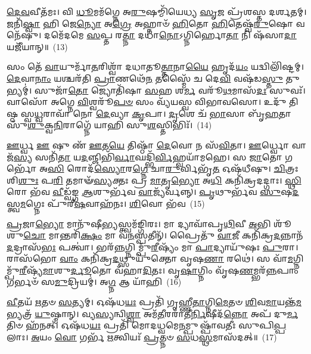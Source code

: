 \-\ul{𑌦𑍇}\-\-\ul{𑌵}\-𑌵𑍀𑌤᳴𑌮𑌃। 𑌵𑌿 \ul{𑌧𑍂}\-𑌮𑌮᳴𑌗𑍍𑌨𑍇 𑌅\-\ul{𑌰𑍁}\-𑌷𑌮𑍍𑌮𑌿᳴𑌯𑍇𑌧𑍍𑌯 \ul{𑌸𑍃}\-𑌜 𑌪𑍍𑌰᳴𑌶𑌸𑍍𑌤 𑌦𑌰𑍍\mbox{}\-\ul{𑌶}\-𑌤𑌮𑍍। 𑌜𑌨𑌿᳴\-\ul{𑌷𑍍𑌵𑌾} 𑌹𑌿 𑌜𑍇\-\ul{𑌨𑍍𑌯𑍋} 𑌅\-\ul{𑌗𑍍𑌰𑍇} 𑌅𑌹𑍍𑌨𑌾𑍞᳴ \ul{𑌹𑌿}\-𑌤𑍋 \ul{𑌹𑌿}\-𑌤𑍇𑌷𑍍𑌵᳴\-\ul{𑌰𑍁}\-𑌷𑍋 𑌵𑌨𑍇᳴𑌷𑍁। 𑌦𑌮𑍇᳴𑌦𑌮𑍇 \ul{𑌸}\-𑌪𑍍𑌤 𑌰\-\ul{𑌤𑍍𑌨𑌾} 𑌦𑌧𑌾᳴\-\ul{𑌨𑍋}\-\-𑌽𑌗𑍍𑌨𑌿𑌰𑍍\mbox{}𑌹𑍋\-\ul{𑌤𑌾} 𑌨𑌿 𑌷᳴𑌸𑌾\-\ul{𑌦𑌾} 𑌯𑌜𑍀᳴𑌯𑌾𑌨𑍍॥~(13)

{\anuvakamend[{\-\ul{𑌸𑍍𑌥} \ul{𑌈}\-\-\ul{𑌧𑍇} 𑌶𑍋𑌚᳴𑌸𑍍𑌵 \ul{𑌸}\-𑌪𑍍𑌤𑌵𑌿𑍞᳴𑌶𑌤𑌿𑌶𑍍𑌚}]}%

𑌸𑌂 𑌤𑍇᳴ \ul{𑌵𑌾}\-𑌯𑍁𑌰𑍍𑌮𑌾᳴\-\ul{𑌤}\-𑌰𑌿𑌶𑍍𑌵𑌾᳴ 𑌦𑌧𑌾𑌤𑍂\-\ul{𑌤𑍍𑌤𑌾}\-𑌨𑌾\-\ul{𑌯𑍈} 𑌹𑍃𑌦᳴\-\ul{𑌯𑌂} 𑌯𑌦𑍍𑌵𑌿𑌲𑌿᳴𑌷𑍍𑌟𑌮𑍍। \ul{𑌦𑍇}\-𑌵𑌾\-\ul{𑌨𑌾𑌂} 𑌯𑌶𑍍𑌚𑌰᳴𑌤𑌿 \ul{𑌪𑍍𑌰𑌾}\-𑌣𑌥𑍇᳴\-\ul{𑌨} 𑌤𑌸𑍍𑌮𑍈᳴ 𑌚 𑌦𑍇\-\ul{𑌵𑌿} 𑌵𑌷᳴𑌡\-\ul{𑌸𑍍𑌤𑍁} 𑌤𑍁𑌭𑍍𑌯𑌮𑍍॑। 𑌸𑍁𑌜𑌾᳴\-\ul{𑌤𑍋} 𑌜𑍍𑌯𑍋𑌤𑌿᳴𑌷𑌾 \ul{𑌸}\-𑌹 𑌶\-\ul{𑌰𑍍𑌮} 𑌵𑌰𑍂᳴\-\ul{𑌥}\-𑌮𑌾𑌸᳴\-\ul{𑌦𑌃} 𑌸𑍁𑌵𑌃᳴। 𑌵𑌾𑌸𑍋᳴ 𑌅𑌗𑍍𑌨𑍇 \ul{𑌵𑌿}\-𑌶𑍍𑌵𑌰𑍂᳴\-\ul{𑌪}\-\-\ul{𑍞} 𑌸𑌂 𑌵𑍍𑌯᳴𑌯𑌸𑍍𑌵 𑌵𑌿𑌭𑌾𑌵𑌸𑍋। 𑌉𑌦𑍁᳴ 𑌤𑌿𑌷𑍍𑌠 𑌸𑍍𑌵\-\ul{𑌧𑍍𑌵}\-𑌰𑌾𑌵𑌾᳴ 𑌨𑍋 \ul{𑌦𑍇}\-𑌵𑍍𑌯𑌾 \ul{𑌕𑍃}\-𑌪𑌾। \ul{𑌦𑍃}\-𑌶𑍇 𑌚᳴ \ul{𑌭𑌾}\-𑌸𑌾 𑌬𑍃᳴\-\ul{𑌹}\-𑌤𑌾 𑌸𑍁᳴\-\ul{𑌶𑍁}\-𑌕𑍍𑌵\-\ul{𑌨𑌿}\-𑌰𑌾𑌗𑍍𑌨𑍇᳴ 𑌯𑌾𑌹𑌿 𑌸𑍁\-\ul{𑌶}\-𑌸𑍍𑌤𑌿𑌭𑌿𑌃᳴।~(14)

\-\ul{𑌊}\-𑌰𑍍𑌧𑍍𑌵 \ul{𑌊} 𑌷𑍁 𑌣᳴ \ul{𑌊}\-𑌤\-\ul{𑌯𑍇} 𑌤𑌿𑌷𑍍𑌠𑌾᳴ \ul{𑌦𑍇}\-𑌵𑍋 𑌨 𑌸᳴\-\ul{𑌵𑌿}\-𑌤𑌾। \ul{𑌊}\-𑌰𑍍𑌧𑍍𑌵𑍋 𑌵𑌾𑌜᳴\-\ul{𑌸𑍍𑌯} 𑌸𑌨𑌿᳴\-\ul{𑌤𑌾} 𑌯\-\ul{𑌦}\-𑌞𑍍𑌜𑌿𑌭𑌿᳴\-\ul{𑌰𑍍𑌵𑌾}\-𑌘𑌦𑍍𑌭𑌿᳴\-\ul{𑌰𑍍𑌵𑌿}\-𑌹𑍍𑌵𑌯𑌾᳴𑌮𑌹𑍇। 𑌸 \ul{𑌜𑌾}\-𑌤𑍋 𑌗𑌰𑍍𑌭𑍋᳴ 𑌅\-\ul{𑌸𑌿} 𑌰𑍋𑌦᳴\-\ul{𑌸𑍍𑌯𑍋}\-𑌰\-\ul{𑌗𑍍𑌨𑍇} 𑌚𑌾\-\ul{𑌰𑍁}\-𑌰𑍍𑌵𑌿𑌭𑍃᳴\-\ul{𑌤} 𑌓𑌷᳴𑌧𑍀𑌷𑍁। \ul{𑌚𑌿}\-𑌤𑍍𑌰𑌃 𑌶𑌿\-\ul{𑌶𑍁𑌃} 𑌪\-\ul{𑌰𑌿} 𑌤𑌮𑌾𑍟᳴\-\ul{𑌸𑍍𑌯}\-𑌕𑍍𑌤𑌃 𑌪𑍍𑌰 \ul{𑌮𑌾}\-𑌤𑍃\-\ul{𑌭𑍍𑌯𑍋} 𑌅\-\ul{𑌧𑌿} 𑌕𑌨𑌿᳴𑌕𑍍𑌰𑌦𑌦𑍍𑌗𑌾𑌃। \ul{𑌸𑍍𑌥𑌿}\-𑌰𑍋 𑌭᳴𑌵 \ul{𑌵𑍀}\-𑌡𑍍𑌵᳴𑌙𑍍𑌗 \ul{𑌆}\-𑌶𑍁𑌰𑍍𑌭᳴𑌵 \ul{𑌵𑌾}\-𑌜𑍍𑌯᳴𑌰𑍍𑌵𑌨𑍍𑌨𑍍। \ul{𑌪𑍃}\-𑌥𑍁𑌰𑍍𑌭᳴𑌵 \ul{𑌸𑍁}\-𑌷\-\ul{𑌦}\-𑌸𑍍𑌤𑍍𑌵\-\ul{𑌮}\-𑌗𑍍𑌨𑍇𑌃 𑌪𑍁᳴𑌰𑍀\-\ul{𑌷}\-𑌵𑌾𑌹᳴𑌨𑌃। \ul{𑌶𑌿}\-𑌵𑍋 𑌭᳴𑌵~(15)

\-\ul{𑌪𑍍𑌰}\-𑌜𑌾\-\ul{𑌭𑍍𑌯𑍋} 𑌮𑌾𑌨𑍁᳴𑌷𑍀\-\ul{𑌭𑍍𑌯}\-𑌸𑍍𑌤𑍍𑌵𑌮᳴𑌙𑍍𑌗𑌿𑌰𑌃। 𑌮𑌾 𑌦𑍍𑌯𑌾𑌵𑌾᳴𑌪𑍃\-\ul{𑌥𑌿}\-𑌵𑍀 \ul{𑌅}\-𑌭𑌿 𑌶𑍂᳴𑌶𑍁\-\ul{𑌚𑍋} 𑌮𑌾𑌨𑍍𑌤𑌰𑌿᳴\-\ul{𑌕𑍍𑌷𑌂} 𑌮𑌾 𑌵\-\ul{𑌨}\-𑌸𑍍𑌪𑌤𑍀𑌨𑍍᳴। 𑌪𑍍𑌰𑍈𑌤𑍁᳴ \ul{𑌵𑌾}\-𑌜𑍀 𑌕𑌨𑌿᳴𑌕𑍍𑌰\-\ul{𑌦}\-𑌨𑍍𑌨𑌾𑌨᳴\-\ul{𑌦}\-𑌦𑍍𑌰𑌾𑌸᳴\-\ul{𑌭𑌃} 𑌪𑌤𑍍𑌵𑌾॑। 𑌭𑌰᳴\-\ul{𑌨𑍍𑌨}\-𑌗𑍍𑌨𑌿𑌮𑍍𑌪𑍁᳴\-\ul{𑌰𑍀}\-𑌷𑍍𑌯𑌂᳴ 𑌮𑌾 \ul{𑌪𑌾}\-𑌦𑍍𑌯𑌾𑌯𑍁᳴𑌷𑌃 \ul{𑌪𑍁}\-𑌰𑌾। 𑌰𑌾𑌸᳴𑌭𑍋 \ul{𑌵𑌾𑌂} 𑌕𑌨𑌿᳴𑌕𑍍𑌰\-\ul{𑌦}\-𑌥𑍍𑌸𑍁𑌯𑍁᳴𑌕𑍍𑌤𑍋 𑌵𑍃𑌷\-\ul{𑌣𑌾} 𑌰𑌥𑍇॑। 𑌸 𑌵𑌾᳴\-\ul{𑌮}\-𑌗𑍍𑌨𑌿𑌮𑍍𑌪𑍁᳴\-\ul{𑌰𑍀}\-𑌷𑍍𑌯᳴\-\ul{𑌮𑌾}\-𑌶𑍁\-\ul{𑌰𑍍𑌦𑍂}\-𑌤𑍋 𑌵᳴𑌹𑌾\-\ul{𑌦𑌿}\-𑌤𑌃। 𑌵𑍃\-\ul{𑌷𑌾}\-𑌗𑍍𑌨𑌿𑌂 𑌵𑍃᳴𑌷\-\ul{𑌣}\-𑌮𑍍𑌭𑌰᳴\-\ul{𑌨𑍍𑌨}\-𑌪𑌾𑌂 𑌗𑌰𑍍𑌭𑍞᳴ 𑌸\-\ul{𑌮𑍁}\-𑌦𑍍𑌰𑌿𑌯𑌮𑍍॑। 𑌅\-\ul{𑌗𑍍𑌨} 𑌆 𑌯𑌾᳴𑌹𑌿~(16)

\-\ul{𑌵𑍀}\-𑌤𑌯᳴ \ul{𑌋}\-𑌤𑍞 \ul{𑌸}\-𑌤𑍍𑌯𑌮𑍍। 𑌓𑌷᳴𑌧\-\ul{𑌯𑌃} 𑌪𑍍𑌰𑌤𑌿᳴ 𑌗𑍃𑌹𑍍𑌣𑍀\-\ul{𑌤𑌾}\-𑌗𑍍𑌨𑌿\-\ul{𑌮𑍇}\-𑌤𑍞 \ul{𑌶𑌿}\-𑌵\-\ul{𑌮𑌾}\-𑌯𑌨𑍍𑌤᳴\-\ul{𑌮}\-𑌭𑍍𑌯𑌤𑍍𑌰᳴ \ul{𑌯𑍁}\-𑌷𑍍𑌮𑌾𑌨𑍍। 𑌵𑍍𑌯\-\ul{𑌸𑍍𑌯}\-𑌨𑍍𑌵𑌿\-\ul{𑌶𑍍𑌵𑌾} 𑌅𑌮᳴\-\ul{𑌤𑍀}\-𑌰𑌰𑌾᳴𑌤𑍀\-\ul{𑌰𑍍𑌨𑌿}\-𑌷𑍀𑌦᳴\-\ul{𑌨𑍍𑌨𑍋} 𑌅𑌪᳴ 𑌦𑍁\-\ul{𑌰𑍍𑌮}\-𑌤𑌿𑍞 𑌹᳴𑌨𑌤𑍍। 𑌓𑌷᳴𑌧\-\ul{𑌯𑌃} 𑌪𑍍𑌰𑌤𑌿᳴ 𑌮𑍋𑌦𑌧𑍍𑌵𑌮𑍇\-\ul{𑌨}\-𑌮𑍍𑌪𑍁𑌷𑍍𑌪𑌾᳴𑌵𑌤𑍀𑌃 𑌸𑍁𑌪𑌿\-\ul{𑌪𑍍𑌪}\-𑌲𑌾𑌃। \ul{𑌅}\-𑌯𑌂 \ul{𑌵𑍋} 𑌗𑌰𑍍𑌭᳴ \ul{𑌋}\-𑌤𑍍𑌵𑌿𑌯𑌃᳴ \ul{𑌪𑍍𑌰}\-𑌤𑍍𑌨𑍞 \ul{𑌸}\-𑌧\-\ul{𑌸𑍍𑌥}\-𑌮𑌾𑌸᳴𑌦𑌤𑍍॥~(17)

